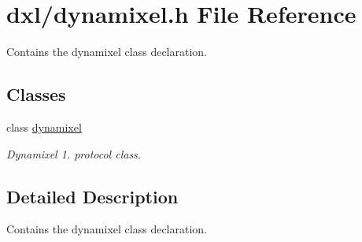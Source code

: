 \hypertarget{a00015}{}\section{dxl/dynamixel.h File Reference}
\label{a00015}


Contains the dynamixel class declaration.  


\subsection*{Classes}
\begin{DoxyCompactItemize}
\item 
class \hyperlink{a00004}{dynamixel}
\begin{DoxyCompactList}\small\item\em Dynamixel 1. protocol class. \end{DoxyCompactList}\end{DoxyCompactItemize}


\subsection{Detailed Description}
Contains the dynamixel class declaration. 

